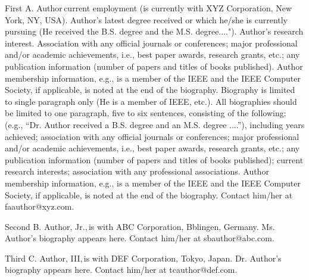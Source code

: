 \documentclass{IEEEcsmag}
\begin{document}
\begin{IEEEbiography}{First A. Author}{\,}current employment (is
currently with XYZ Corporation, New York, NY, USA). Author's latest degree received or which he/she is currently pursuing (He received the B.S. degree and the M.S. degree...."). Author's research interest. Association with any official journals or conferences; major professional and/or academic achievements, i.e., best paper awards, research grants, etc.; any publication information (number of papers and titles of books published). Author membership information, e.g., is a member of the IEEE and the IEEE Computer Society, if applicable, is noted at the end of the biography. Biography is limited to single paragraph only (He is a member of IEEE, etc.). All biographies should be limited to one paragraph, five to six sentences, consisting of the following: (e.g., ``Dr. Author received a B.S. degree and an M.S. degree $\ldots$.''), including years achieved; association with any official journals or conferences; major professional and/or academic achievements, i.e., best paper awards, research grants, etc.; any publication information (number of papers and titles of books published); current research interests; association with any professional associations. Author membership information, e.g., is a member of the IEEE and the IEEE Computer Society, if applicable, is noted at the end of the biography. Contact him/her at faauthor@xyz.com.
\end{IEEEbiography}

\begin{IEEEbiography}{Second B. Author, Jr.,}{\,}is with ABC Corporation, Bblingen, Germany. Ms. Author's biography appears here.  Contact him/her at sbauthor@abc.com.
\end{IEEEbiography}

\begin{IEEEbiography}{Third C. Author, III,}{\,}is with DEF Corporation, Tokyo, Japan. Dr. Author's biography appears here.  Contact him/her at tcauthor@def.com.
\end{IEEEbiography}
\end{document}
